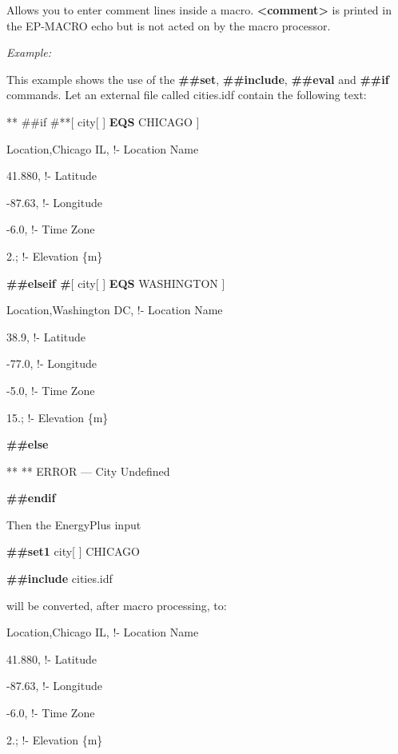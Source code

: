 Allows you to enter comment lines inside a macro. \textbf{\textless{}comment\textgreater{}} is printed in the EP-MACRO echo but is not acted on by the macro processor.

\emph{Example:}

This example shows the use of the \textbf{\#\#set}, \textbf{\#\#include}, \textbf{\#\#eval} and \textbf{\#\#if} commands. Let an external file called cities.idf contain the following text:

** \#\#if \#**{[} city{[} {]} \textbf{EQS} CHICAGO {]}

Location,Chicago IL, !- Location Name

41.880, !- Latitude

-87.63, !- Longitude

-6.0, !- Time Zone

2.; !- Elevation \{m\}

\textbf{\#\#elseif \#}{[} city{[} {]} \textbf{EQS} WASHINGTON {]}

Location,Washington DC, !- Location Name

38.9, !- Latitude

-77.0, !- Longitude

-5.0, !- Time Zone

15.; !- Elevation \{m\}

\textbf{\#\#else}

** ** ERROR --- City Undefined

\textbf{\#\#endif}

Then the EnergyPlus input

\textbf{\#\#set1} city{[} {]} CHICAGO

\textbf{\#\#include} cities.idf

will be converted, after macro processing, to:

Location,Chicago IL, !- Location Name

41.880, !- Latitude

-87.63, !- Longitude

-6.0, !- Time Zone

2.; !- Elevation \{m\}
